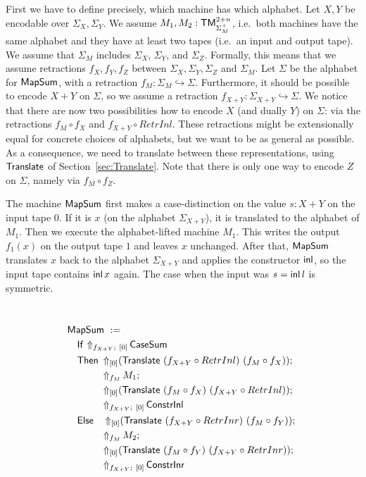 First we have to define precisely, which machine has which alphabet.  Let $X, Y$ be encodable over $\Sigma_X, \Sigma_Y$.  We assume
$M_1, M_2 : \mathsf{TM}_{\Sigma_M^+}^{2+n}$, i.e.\ both machines have the same alphabet and they have at least two tapes (i.e.\ an input and output tape).  We
assume that $\Sigma_M$ includes $\Sigma_X$, $\Sigma_Y$, and $\Sigma_Z$.  Formally, this means that we assume retractions $f_X,f_Y,f_Z$ between
$\Sigma_X, \Sigma_Y, \Sigma_Z$ and $\Sigma_M$.  Let $\Sigma$ be the alphabet for $\MS{MapSum}$, with a retraction
$f_M : \Sigma_M \hookrightarrow \Sigma$.  Furthermore, it should be possible to encode $X+Y$ on $\Sigma$, so we assume a retraction
$f_{X+Y} : \Sigma_{X+Y} \hookrightarrow \Sigma$.  We notice that there are now two possibilities how to encode $X$ (and dually $Y$) on $\Sigma$: via
the retractions $f_M \circ f_X$ and $f_{X+Y} \circ RetrInl $.  These retractions might be extensionally equal for concrete choices of alphabets, but
we want to be as general as possible.  As a consequence, we need to translate between these representations, using $\mathsf{Translate}$ of
Section~\ref{sec:Translate}.  Note that there is only one way to encode $Z$ on $\Sigma$, namely via $f_M \circ f_Z $.

The machine $\MS{MapSum}$ first makes a case-distinction on the value $s:X+Y$ on the input tape $0$.  If it is $x$ (on the alphabet $\Sigma_{X+Y}$),
it is translated to the alphabet of $M_1$.  Then we execute the alphabet-lifted machine $M_1$.  This writes the output $f_1(x)$ on the output tape $1$
and leaves $x$ unchanged.  After that, $\MS{MapSum}$ translates $x$ back to the alphabet $\Sigma_{X+Y}$ and applies the constructor $\operatorname{\mathsf{inl}}$, so the
input tape contains $\operatorname{\mathsf{inl}} x$ again.  The case when the input was $s=\operatorname{\mathsf{inl}} l$ is symmetric.

\begin{definition}[$\MS{MapSum}$][MapSum]
  \label{def:MapSum}
  ~
  \begin{align*}
    & \MS{MapSum}~:= \\
    &\quad \MS{If}~{\LiftBoth{\MS{CaseSum}}{f_{X+Y}}{\Vector{0}}} \\
    &\quad \MS{Then}~ \LiftTapes{(\MS{Translate}~(f_{X+Y} \circ RetrInl)~(f_M \circ f_X))}{\Vector{0}} \Seq \\
    &\quad \phantom{\MS{Then}}~ \LiftAlphabet{M_1}{f_M} \Seq \\
    &\quad \phantom{\MS{Then}}~ \LiftTapes{(\MS{Translate}~(f_M \circ f_X)~(f_{X+Y} \circ RetrInl))}{\Vector{0}} \Seq \\
    &\quad \phantom{\MS{Then}}~ \LiftBoth{\MS{ConstrInl}}{f_{X+Y}}{\Vector{0}} \\
    &\quad \MS{Else}~~~ \LiftTapes{(\MS{Translate}~(f_{X+Y} \circ RetrInr)~(f_M \circ f_Y))}{\Vector{0}} \Seq \\
    &\quad \phantom{\MS{Then}}~ \LiftAlphabet{M_2}{f_M} \Seq \\
    &\quad \phantom{\MS{Then}}~ \LiftTapes{(\MS{Translate}~(f_M \circ f_Y)~(f_{X+Y} \circ RetrInr))}{\Vector{0}} \Seq \\
    &\quad \phantom{\MS{Then}}~ \LiftBoth{\MS{ConstrInr}}{f_{X+Y}}{\Vector{0}}
  \end{align*}
\end{definition}

